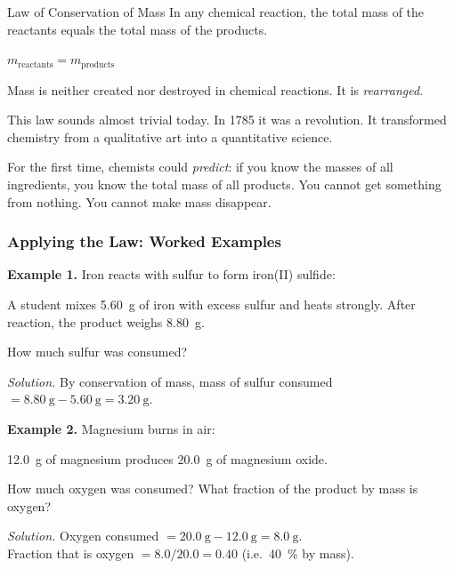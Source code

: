 \documentclass[12pt, a4paper]{book}
\theoremstyle{definition}
\begin{document}
\begin{namedconcept}{Law of Conservation of Mass}
In any chemical reaction,
the total mass of the reactants equals
the total mass of the products.

\begin{center}
\Large
$m_{\text{reactants}} = m_{\text{products}}$
\end{center}

Mass is neither created nor destroyed in chemical reactions.
It is \emph{rearranged}.
\end{namedconcept}

\vspace{0.5em}

This law sounds almost trivial today.
In 1785 it was a revolution.
It transformed chemistry from a qualitative art
into a quantitative science.

For the first time, chemists could \emph{predict}:
if you know the masses of all ingredients,
you know the total mass of all products.
You cannot get something from nothing.
You cannot make mass disappear.

\subsubsection{Applying the Law: Worked Examples}

\textbf{Example 1.} Iron reacts with sulfur to form iron(II) sulfide:
\begin{center}
\end{center}
A student mixes \SI{5.60}{\gram} of iron with excess sulfur
and heats strongly.
After reaction, the product weighs \SI{8.80}{\gram}.

How much sulfur was consumed?

\vspace{0.3em}
\textit{Solution.}
By conservation of mass, mass of sulfur consumed
$= \SI{8.80}{\gram} - \SI{5.60}{\gram} = \SI{3.20}{\gram}$.

\vspace{0.5em}

\textbf{Example 2.} Magnesium burns in air:
\begin{center}
\end{center}
\SI{12.0}{\gram} of magnesium produces \SI{20.0}{\gram} of magnesium oxide.

How much oxygen was consumed?
What fraction of the product by mass is oxygen?

\vspace{0.3em}
\textit{Solution.}
Oxygen consumed $= \SI{20.0}{\gram} - \SI{12.0}{\gram} = \SI{8.0}{\gram}$.\\
Fraction that is oxygen $= 8.0/20.0 = 0.40$ (i.e.\ \SI{40}{\percent} by mass).
\end{document}
